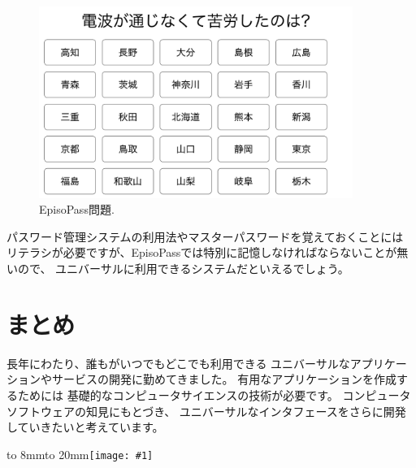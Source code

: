 \documentclass[topics]{compsoft} %
\begin{document}
\begin{figure}[t]
  \includegraphics[width=10.2cm,bb=0 0 2418 1480]{figures/e5c3cabfe3011ef807b5e045c2d83ea8.png}
  \caption{EpisoPass問題.}
  \label{episopass}
\end{figure}

パスワード管理システムの利用法やマスターパスワードを覚えておくことには
リテラシが必要ですが、EpisoPassでは特別に記憶しなければならないことが無いので、
ユニバーサルに利用できるシステムだといえるでしょう。

\section{まとめ}

長年にわたり、誰もがいつでもどこでも利用できる
ユニバーサルなアプリケーションやサービスの開発に勤めてきました。
有用なアプリケーションを作成するためには
基礎的なコンピュータサイエンスの技術が必要です。
コンピュータソフトウェアの知見にもとづき、
ユニバーサルなインタフェースをさらに開発していきたいと考えています。




\vspace{2mm}

\def\choshapicturex#1{%
  \vbox to 8mm{\hbox to 20mm{\texttt{[image: \#1]}}}}
\choshapicturex{figures/f91ce16aa949ec47fa99da1fe7809b88.jpg}

  
\end{document}
